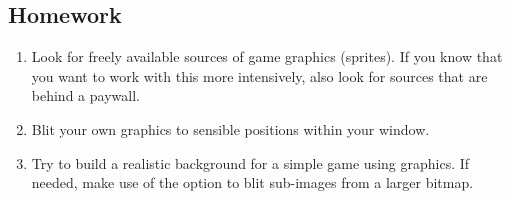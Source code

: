 \subsection{Homework}

\begin{enumerate}
	\item Look for freely available sources of game graphics (sprites). If you know that you want to work with this more intensively, also look for sources that are behind a paywall.

	\item Blit your own graphics to sensible positions within your window. 
	
	\item Try to build a realistic background for a simple game using graphics. If needed, make use of the option to blit sub-images from a larger bitmap.
\end{enumerate}